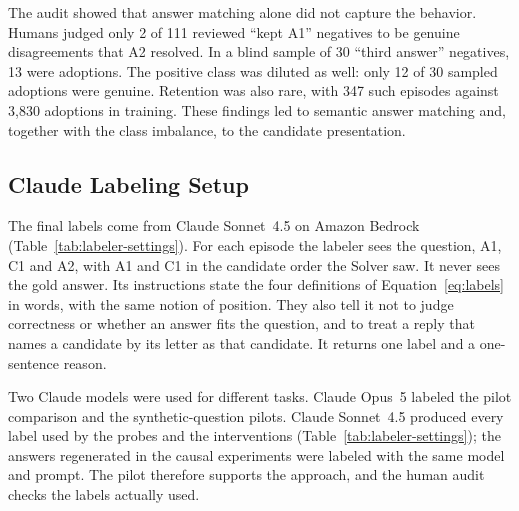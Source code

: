The audit showed that answer matching alone did not capture the behavior.
Humans judged only 2 of 111 reviewed ``kept A1'' negatives to be genuine
disagreements that A2 resolved. In a blind sample of 30 ``third answer''
negatives, 13 were adoptions. The positive class was diluted as well: only 12
of 30 sampled adoptions were genuine. Retention was also rare, with 347 such
episodes against 3,830 adoptions in training. These findings led to semantic
answer matching and, together with the class imbalance, to the candidate
presentation.

\subsection{Claude Labeling Setup}
\label{sec:claude-labeler}

The final labels come from Claude Sonnet~4.5 on Amazon Bedrock
(Table~\ref{tab:labeler-settings}). For each episode the labeler sees the
question, A1, C1 and A2, with A1 and C1 in the candidate order the Solver saw.
It never sees the gold answer. Its instructions state the four definitions of
Equation~\ref{eq:labels} in words, with the same notion of position. They also
tell it not to judge correctness or whether an answer fits the question, and
to treat a reply that names a candidate by its letter as that candidate. It
returns one label and a one-sentence reason.

Two Claude models were used for different tasks. Claude Opus~5 labeled the
pilot comparison and the synthetic-question pilots. Claude Sonnet~4.5
produced every label used by the probes and the interventions
(Table~\ref{tab:labeler-settings}); the answers regenerated in the causal
experiments were labeled with the same model and prompt. The pilot therefore
supports
the approach, and the human audit checks the labels actually used.

